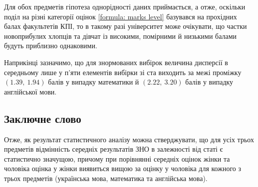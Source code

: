 \documentclass[a4paper,14pt]{extarticle} %
\numberwithin{equation}{section}
\begin{document}
Для обох предметів гіпотеза однорідності даних приймається, а отже, оскільки поділ на різні категорії оцінок 
\eqref{formula: marks level} базувався на прохідних балах факультетів КПІ, то в такому разі університет може 
очікувати, що частки новоприбулих хлопців та дівчат із високими, помірними й низькими балами будуть приблизно 
однаковими.

Наприкінці зазначимо, що для знормованих вибірок величина дисперсії в середньому лише у п'яти елементів 
вибірки зі ста виходить за межі проміжку $(1.39,\ 1.94)$ балів у випадку математики й $(2.22,\ 3.20)$ балів у 
випадку англійської мови.

\subsection*{Заключне слово}

Отже, як результат статистичного аналізу можна стверджувати, що для усіх трьох предметів відмінність середніх 
результатів ЗНО в залежності від статі є статистично значущою, причому при порівнянні середніх оцінок жінки 
та чоловіка оцінка у жінки виявиться вищою за оцінку у чоловіка для кожного з трьох предметів (українська мова, 
математика та англійська мова).
\end{document}
